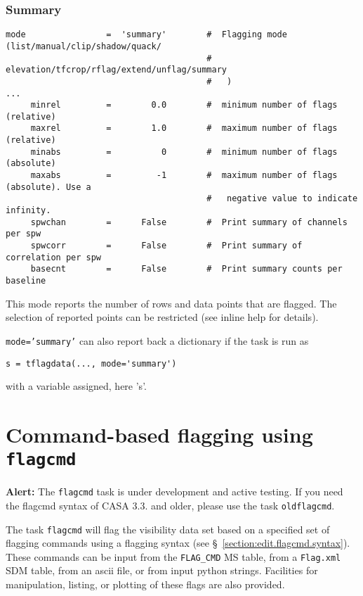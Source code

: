 \subsubsection{Summary}
\label{section:edit.tflagdata.mode.summary}
\small
\begin{verbatim}
mode                =  'summary'        #  Flagging mode (list/manual/clip/shadow/quack/
                                        #   elevation/tfcrop/rflag/extend/unflag/summary
                                        #   )
...
     minrel         =        0.0        #  minimum number of flags (relative)
     maxrel         =        1.0        #  maximum number of flags (relative)
     minabs         =          0        #  minimum number of flags (absolute)
     maxabs         =         -1        #  maximum number of flags (absolute). Use a
                                        #   negative value to indicate infinity.
     spwchan        =      False        #  Print summary of channels per spw
     spwcorr        =      False        #  Print summary of correlation per spw
     basecnt        =      False        #  Print summary counts per baseline
\end{verbatim}
\normalsize

This mode reports the number of rows and data points that are
flagged. The selection of reported points can be restricted (see
inline help for details).

{\tt mode='summary'} can also report back a dictionary if the task is run as 

\small
\begin{verbatim}
s = tflagdata(..., mode='summary')
\end{verbatim}
\normalsize

with a variable assigned, here 's'.



\section{Command-based flagging using {\tt flagcmd}}
\label{section:edit.flagcmd}

{\bf Alert:} The {\tt flagcmd} task is under development and active
testing. If you need the flagcmd syntax of CASA 3.3. and older, please
use the task {\tt oldflagcmd}.

The task {\tt flagcmd} will flag the visibility data set based on 
a specified set of flagging commands using a flagging 
syntax (see \S~\ref{section:edit.flagcmd.syntax}).  These commands
can be input from the {\tt FLAG\_CMD} MS table, from a 
{\tt Flag.xml} SDM table, from an ascii
file, or from input python strings.  Facilities for manipulation,
listing, or plotting of these flags are also provided.

